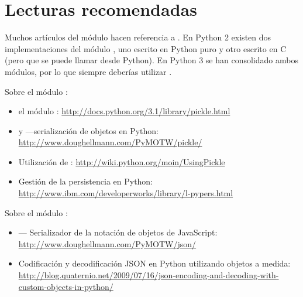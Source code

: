 \section{Lecturas recomendadas}

Muchos artículos del módulo  hacen referencia a . En Python 2 existen dos implementaciones del módulo , uno escrito en Python puro y otro escrito en C (pero que se puede llamar desde Python). En Python 3 se han consolidado ambos módulos, por lo que siempre deberías utilizar . 

\noindent Sobre el módulo :

\begin{itemize}

\item el módulo : \newline
\href{http://docs.python.org/3.1/library/pickle.html}{http://docs.python.org/3.1/library/pickle.html}

\item {} y  ---serialización de objetos en Python: \newline
\href{http://www.doughellmann.com/PyMOTW/pickle/}{http://www.doughellmann.com/PyMOTW/pickle/}

\item Utilización de : \newline
\href{http://wiki.python.org/moin/UsingPickle}{http://wiki.python.org/moin/UsingPickle}

\item Gestión de la persistencia en Python: \newline
\href{http://www.ibm.com/developerworks/library/l-pypers.html}{http://www.ibm.com/developerworks/library/l-pypers.html}

\end{itemize}

\noindent Sobre el módulo :

\begin{itemize}

\item {} --- Serializador de la notación de objetos de JavaScript: \newline
\href{http://www.doughellmann.com/PyMOTW/json/}{http://www.doughellmann.com/PyMOTW/json/}

\item Codificación y decodificación JSON en Python utilizando objetos a medida: \newline
\href{http://blog.quaternio.net/2009/07/16/json-encoding-and-decoding-with-custom-objects-in-python/}{http://blog.quaternio.net/2009/07/16/json-encoding-and-decoding-with-custom-objects-in-python/}

\end{itemize}

